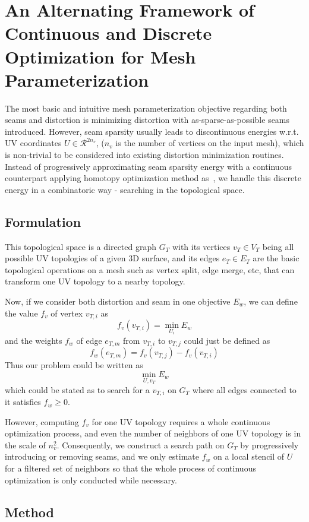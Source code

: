 \section{An Alternating Framework of Continuous and Discrete Optimization for Mesh Parameterization}

The most basic and intuitive mesh parameterization objective regarding both seams and distortion is minimizing distortion with as-sparse-as-possible seams introduced. However, seam sparsity usually leads to discontinuous energies w.r.t. UV coordinates $U \in \mathcal{R}^{2n_v}$, ($n_v$ is the number of vertices on the input mesh), which is non-trivial to be considered into existing distortion minimization routines. Instead of progressively approximating seam sparsity energy with a continuous counterpart applying homotopy optimization method as~\cite{Poranne2017Autocuts}, we handle this discrete energy in a combinatoric way - searching in the topological space.

\subsection{Formulation}

This topological space is a directed graph $G_T$ with its vertices $v_T \in V_T$ being all possible UV topologies of a given 3D surface, and its edges $e_T \in E_T$ are the basic topological operations on a mesh such as vertex split, edge merge, etc, that can transform one UV topology to a nearby topology.

Now, if we consider both distortion and seam in one objective $E_w$, we can define the value $f_v$ of vertex $v_{T,i}$ as 
\[ f_v(v_{T,i}) = \min_{U_i} E_w \]
and the weights $f_w$ of edge $e_{T,m}$ from $v_{T,i}$ to $v_{T,j}$ could just be defined as 
\[ f_w(e_{T,m}) = f_v(v_{T,j}) - f_v(v_{T,i}) \]
Thus our problem could be written as
\[ \min_{U, v_T} E_w \]
which could be stated as to search for a $v_{T,i}$ on $G_T$ where all edges connected to it satisfies $f_w \geq 0$. 

However, computing $f_v$ for one UV topology requires a whole continuous optimization process, and even the number of neighbors of one UV topology is in the scale of $n_v^2$. Consequently, we construct a search path on $G_T$ by progressively introducing or removing seams, and we only estimate $f_w$ on a local stencil of $U$ for a filtered set of neighbors so that the whole process of continuous optimization is only conducted while necessary.

\subsection{Method}

